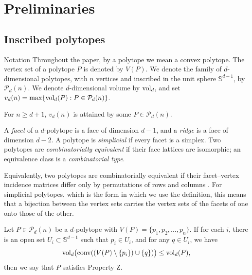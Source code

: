 \section{Preliminaries}
\label{sec:prelim}

\subsection{Inscribed polytopes}

\begin{cited}{Notation}{{\cite[Section~1]{horvath-langi-2016}}}
  Throughout the paper, by a polytope we mean a convex polytope. The vertex set
  of a polytope $P$ is denoted by $V(P)$. We denote the family of
  $d$-dimensional polytopes, with $n$ vertices and inscribed in the unit sphere
  $\mathbb{S}^{d-1}$, by $\mathcal{P}_{d}(n)$. We denote $d$-dimensional
  volume by $\operatorname{vol}_{d}$, and set
  $v_{d}(n) = \max\{\operatorname{vol}_{d}(P) : P \in \mathcal{P}_{d}(n)\}$.
\end{cited}

\begin{remark}
  \label{rem:attained}
  For $n \geq d + 1$, $v_{d}(n)$ is attained by some
  $P \in \mathcal{P}_{d}(n)$.
\end{remark}

\begin{definition}
  A \emph{facet} of a $d$-polytope is a face of dimension $d-1$, and a
  \emph{ridge} is a face of dimension $d-2$. A polytope is \emph{simplicial} if
  every facet is a simplex. Two polytopes are \emph{combinatorially
  equivalent} if their face lattices are isomorphic; an equivalence class is a
  \emph{combinatorial type}.
\end{definition}

Equivalently, two polytopes are combinatorially equivalent if their
facet--vertex incidence matrices differ only by permutations of rows and
columns \cite[Section~15.1.1]{henk-richter-gebert-ziegler-2017}. For
simplicial polytopes, which is the form in which we use the definition, this
means that a bijection between the vertex sets carries the vertex sets of the
facets of one onto those of the other.

\begin{definition}
  \label{def:propertyz}
  Let $P \in \mathcal{P}_{d}(n)$ be a $d$-polytope with
  $V(P) = \{p_{1}, p_{2}, \ldots, p_{n}\}$. If for each $i$, there is an open
  set $U_{i} \subset \mathbb{S}^{d-1}$ such that $p_{i} \in U_{i}$, and for any
  $q \in U_{i}$, we have
  \begin{equation*}
    \operatorname{vol}_{d}\bigl(\operatorname{conv}((V(P) \setminus \{p_{i}\}) \cup \{q\})\bigr)
      \leq \operatorname{vol}_{d}(P),
  \end{equation*}
  then we say that $P$ satisfies Property Z.
\end{definition}

